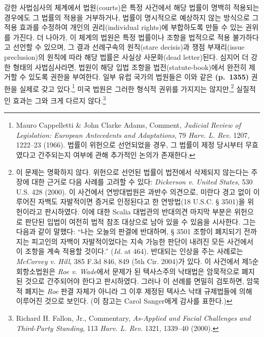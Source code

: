 \documentclass[a4paper,12pt,oneside]{article}  %
\begin{document}
강한 사법심사의 체계에서 법원(courts)은 특정 사건에서 해당 법률이 명백히
적용되는 경우에도 그 법률의 적용을 거부하거나, 법률이 명시적으로
예상하지 않는 방식으로 그 적용 효과를 수정하여 개인의 권리(individual
rights)에 부합하도록 만들 수 있는 권위를 가진다. 더 나아가, 이 체계의
법원은 특정 법률이나 조항을 법적으로 적용 불가하다고 선언할 수 있으며,
그 결과 선례구속의 원칙(stare decisis)과 쟁점 부재리(issue preclusion)의
원칙에 따라 해당 법률은 사실상 사문화(dead letter)된다. 심지어 더 강한
형태의 사법심사라면, 법원이 해당 입법 조항을 법전(statute-book)에서
완전히 제거할 수 있도록 권한을 부여한다. 일부 유럽 국가의 법원들은 이와
같은 \textbf{(p.~1355)} 권한을 실제로 갖고 있다.\footnote{Mauro
  Cappelletti \& John Clarke Adams, Comment, \emph{Judicial Review of
  Legislation: European Antecedents and Adaptations}, 79 \emph{Harv. L.
  Rev.} 1207, 1222--23 (1966). 법률이 위헌으로 선언되었을 경우, 그
  법률이 제정 당시부터 무효였다고 간주되는지 여부에 관해 추가적인 논의가
  존재한다.} 미국 법원은 그러한 형식적 권위를 가지지는
않지만,\footnote{이 문제는 명확하지 않다. 위헌으로 선언된 법률이
  법전에서 삭제되지 않는다는 주장에 대한 근거로 다음 사례를 고려할 수
  있다: \emph{Dickerson v. United States}, 530 U.S. 428 (2000). 이
  사건에서 연방대법원은 과반수 의견으로, 미란다 경고 없이 이루어진
  자백도 자발적이면 증거로 인정된다고 한 연방법(18 U.S.C. § 3501)을
  위헌이라고 판시하였다. 이에 대한 Scalia 대법관의 반대의견 마지막
  부분은 위헌으로 판단된 입법이 여전히 법적 참조 대상으로 남아 있을 수
  있음을 시사한다. 그는 다음과 같이 말했다: ``나는 오늘의 판결에
  반대하며, § 3501 조항이 폐지되기 전까지는 피고인의 자백이
  자발적이었다는 지속 가능한 판단이 내려진 모든 사건에서 이 조항을 계속
  적용할 것이다.'' (\emph{Id.} at 464). 반대되는 인상을 주는 사례로는
  \emph{McCorvey v. Hill}, 385 F.3d 846, 849 (5th Cir. 2004)가 있다. 이
  사건에서 제5순회항소법원은 \emph{Roe v. Wade}에서 문제가 된 텍사스주의
  낙태법은 암묵적으로 폐지된 것으로 간주되어야 한다고 판시하였다. 그러나
  이 선례를 면밀히 검토하면, 암묵적 폐지는 \emph{Roe} 판결 자체가 아니라
  그 이후 제정된 텍사스 낙태 규제법들에 의해 이루어진 것으로 보인다. (이
  참고는 Carol Sanger에게 감사를 표한다.)} 실질적인 효과는 그와 크게
다르지 않다.\footnote{Richard H. Fallon, Jr., Commentary,
  \emph{As-Applied and Facial Challenges and Third-Party Standing}, 113
  \emph{Harv. L. Rev.} 1321, 1339--40 (2000).}
\end{document}
